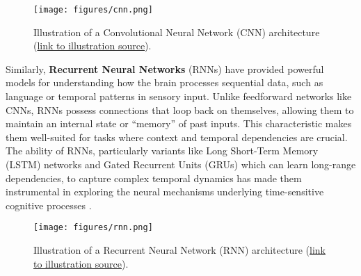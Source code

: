 \begin{figure}[H]
    \centering
    \texttt{[image: figures/cnn.png]}
    \caption{Illustration of a Convolutional Neural Network (CNN) architecture (\href{https://developersbreach.com/convolution-neural-network-deep-learning/}{link to illustration source}).}
    \label{fig:cnn-architecture}
\end{figure}

Similarly, \textbf{Recurrent Neural Networks} (RNNs) have provided powerful models for understanding how the brain processes sequential data, such as language or temporal patterns in sensory input. Unlike feedforward networks like CNNs, RNNs possess connections that loop back on themselves, allowing them to maintain an internal state or ``memory'' of past inputs. This characteristic makes them well-suited for tasks where context and temporal dependencies are crucial. The ability of RNNs, particularly variants like Long Short-Term Memory (LSTM) networks and Gated Recurrent Units (GRUs) which can learn long-range dependencies, to capture complex temporal dynamics has made them instrumental in exploring the neural mechanisms underlying time-sensitive cognitive processes \cite{richards2019deep}.

\begin{figure}[H]
    \centering
    \texttt{[image: figures/rnn.png]}
    \caption{Illustration of a Recurrent Neural Network (RNN) architecture (\href{https://www.analyticsvidhya.com/blog/2022/03/a-brief-overview-of-recurrent-neural-networks-rnn/}{link to illustration source}).}
    \label{fig:rnn-architecture}
\end{figure}

\clearpage
